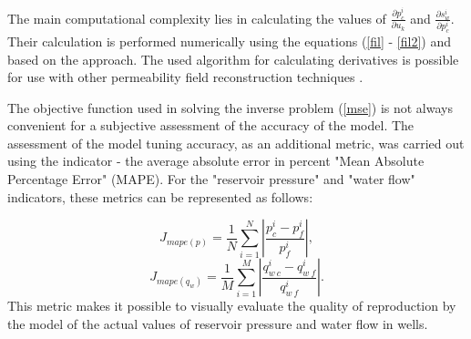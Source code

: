 \documentclass[
11pt,%
tightenlines,%
twoside,%
onecolumn,%
nofloats,%
nobibnotes,%
nofootinbib,%
superscriptaddress,%
noshowpacs,%
centertags]%
{revtex4}
\begin{document}
The main computational complexity lies in calculating the values of $\frac{\partial p_c^i}{\partial u_k}$ and $\frac{\partial s_w^i}{\partial p_c^i}$. Their calculation is performed numerically using the equations (\ref{fil} - \ref{fil2}) and based on the \cite{opt} approach. The used algorithm for calculating derivatives is possible for use with other permeability field reconstruction techniques \cite{leg}.

The objective function used in solving the inverse problem ({\ref{mse}}) is not always convenient for a subjective assessment of the accuracy of the model. The assessment of the model tuning accuracy, as an additional metric, was carried out using the indicator - the average absolute error in percent "Mean Absolute Percentage Error" (MAPE). For the "reservoir pressure" and "water flow" indicators, these metrics can be represented as follows:

\begin{equation} \label{mape_p}
 	J_{mape(p)}=\frac{1}{N}\sum_{i=1}^N{\left|\frac{p_c^i-p_f^i}{p_f^i}\right|},
\end{equation}
\begin{equation} \label{mape_qo}
 	J_{mape(q_w)}=\frac{1}{M}\sum_{i=1}^M{\left|\frac{q_{w\:c}^i-q_{w\:f}^i}{q_{w\:f}^i}\right|}.
\end{equation}
This metric makes it possible to visually evaluate the quality of reproduction by the model of the actual values of reservoir pressure and water flow in wells.
\end{document}
